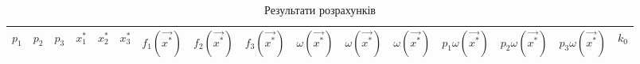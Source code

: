     \begin{landscape}%
        \begin{table}[H]        
    	    \caption{Результати розрахунків}
	        \label{tab:result}
	        \footnotesize
        \begin{tabular}{c c c|c c c|c c c|c c c|c c c|c}
            $p_1$   & $p_2$   & $p_3$ 
            & $x_1^*$ & $x_2^*$ & $x_3^*$
            & $f_1(\vec{x^*})$ & $f_2(\vec{x^*})$ & $f_3(\vec{x^*})$
            & $\omega(\vec{x^*})$ & $\omega(\vec{x^*})$ & $\omega(\vec{x^*})$
            & $p_1\omega(\vec{x^*})$ & $p_2\omega(\vec{x^*})$ & $p_3\omega(\vec{x^*})$
            & $k_0$ \\
            \hline


\end{tabular}
\end{table}
\end{landscape}
